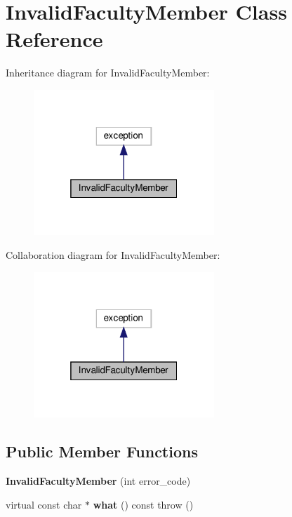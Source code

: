 \hypertarget{classInvalidFacultyMember}{}\section{Invalid\+Faculty\+Member Class Reference}
\label{classInvalidFacultyMember}


Inheritance diagram for Invalid\+Faculty\+Member\+:\nopagebreak
\begin{figure}[H]
\begin{center}
\leavevmode
\includegraphics[width=193pt]{classInvalidFacultyMember__inherit__graph}
\end{center}
\end{figure}


Collaboration diagram for Invalid\+Faculty\+Member\+:\nopagebreak
\begin{figure}[H]
\begin{center}
\leavevmode
\includegraphics[width=193pt]{classInvalidFacultyMember__coll__graph}
\end{center}
\end{figure}
\subsection*{Public Member Functions}
\begin{DoxyCompactItemize}
\item 
\mbox{\label{classInvalidFacultyMember_ab037a7ef14d1c0fe3b16b7fbeb47f9d4}} 
{\bfseries Invalid\+Faculty\+Member} (int error\+\_\+code)
\item 
\mbox{\label{classInvalidFacultyMember_ac03a8c3d9a4b01765b14bf7fabd5ff8a}} 
virtual const char $\ast$ {\bfseries what} () const  throw ()
\end{DoxyCompactItemize}


